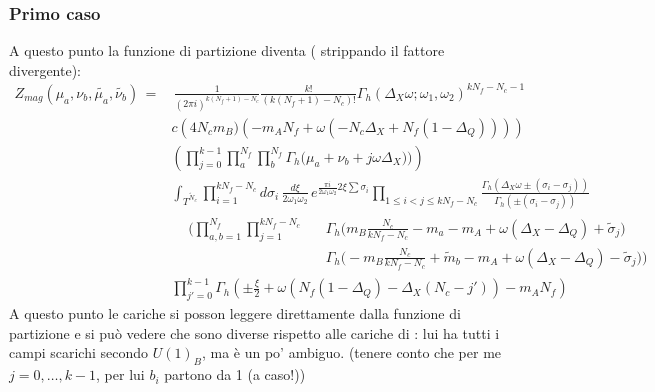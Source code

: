 \documentclass[a4paper,12pt]{article}
\begin{document}
\subsubsection{Primo caso}
A questo punto la funzione di partizione diventa ( strippando il fattore divergente):
\begin{align*}
Z_{mag} ( \mu_a , \nu_b , \tilde{\mu_a}, \tilde{\nu_b} ) \,= & \, \frac{1}{(2 \pi i )^{k(N_f+1) - N_c}}\frac{k!}{ (k(N_f+1) - N_c)! }
 \Gamma_h ( \Delta_X \omega ; \omega_1 , \omega_2)^{ k N_f - N_c -1}  \\
  & c \left( 4 N_c m_B) ( - m_A N_f + \omega( -N_c \Delta_X + N_f ( 1 - \Delta_Q))) \right) \\
 &  \left( \prod_{j=0}^{k-1} 
\prod_a^{N_f } \prod_b^{N_f}  \Gamma_h \big( \mu_a+  \nu_b + j \omega \Delta_X) \big)  \right) \\
&\int_{T^{\tilde{N}_c}}  \prod_{i=1}^{ k N_f - N_c } d \sigma_i \, 
\frac{d \xi}{2 \omega_1 \omega_2} \, e^{ \frac{\pi i }{ 2 \omega_1 \omega_2} 2 \xi  \sum \sigma_i }  \prod_{ 1 \leq i<j \leq k N_f - N_c } \frac{ \Gamma_h( \Delta_X \omega \pm (\sigma_i - \sigma_j)) }{ \Gamma_h ( \pm (\sigma_i - \sigma_j) )} 
  \\&
\begin{aligned}
   &  \bigg( \prod_{a,b=1}^{N_f} \prod_{j=1}^{k N_f - N_c }  	
   && \Gamma_h \big( m_B \frac{N_c}{ k N_f-N_c} - m_a - m_A + \omega (\Delta_X - \Delta_Q)  + \tilde{\sigma}_j \big) \\
 & && \Gamma_h \big(  -m_B \frac{N_c}{k N_f-N_c} + \tilde{m}_b - m_A + \omega (\Delta_X - \Delta_Q)  - \tilde{\sigma}_j \big)  \bigg)
  \end{aligned}
  \\
  & \prod_{j'=0}^{k-1} \Gamma_h \left( \pm \frac{\xi}{2} +\omega \left( 
  N_f ( 1 - \Delta_Q ) - \Delta_X ( N_c - j')  \right) - m_A N_f 
 \right) 
\end{align*}
A questo punto le cariche si posson leggere direttamente dalla funzione di partizione e si può vedere che sono diverse rispetto alle cariche di \citep{Nii:2014jsa}: lui ha tutti i campi scarichi secondo $U(1)_B$, ma è un po' ambiguo. (tenere conto che per me $j = 0, \dots ,k-1$, per lui $b_i$ partono da 1 (a caso!))
\end{document}
